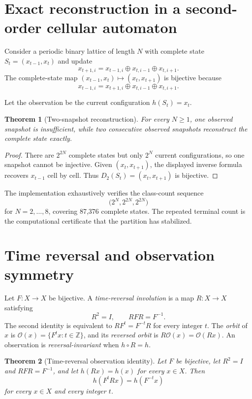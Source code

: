 \documentclass[11pt]{article}
\newtheorem{theorem}{Theorem}
\newcommand{\Z}{\mathbb{Z}}
\begin{document}
\section{Exact reconstruction in a second-order cellular automaton}

Consider a periodic binary lattice of length $N$ with complete state
$S_t=(x_{t-1},x_t)$ and update
\[
x_{t+1,i}=x_{t-1,i}\oplus x_{t,i-1}\oplus x_{t,i+1}.
\]
The complete-state map $(x_{t-1},x_t)\mapsto(x_t,x_{t+1})$ is bijective because
\[
x_{t-1,i}=x_{t+1,i}\oplus x_{t,i-1}\oplus x_{t,i+1}.
\]

Let the observation be the current configuration $h(S_t)=x_t$.

\begin{theorem}[Two-snapshot reconstruction]
For every $N\geq1$, one observed snapshot is insufficient, while two consecutive
observed snapshots reconstruct the complete state exactly.
\end{theorem}

\begin{proof}
There are $2^{2N}$ complete states but only $2^N$ current configurations, so one
snapshot cannot be injective. Given $(x_t,x_{t+1})$, the displayed inverse formula
recovers $x_{t-1}$ cell by cell. Thus $D_2(S_t)=(x_t,x_{t+1})$ is bijective.
\end{proof}

The implementation exhaustively verifies the class-count sequence
\[
\bigl(2^N,2^{2N},2^{2N}\bigr)
\]
for $N=2,\ldots,8$, covering 87,376 complete states. The repeated terminal count
is the computational certificate that the partition has stabilized.

\section{Time reversal and observation symmetry}

Let $F:X\to X$ be bijective. A \emph{time-reversal involution} is a map
$R:X\to X$ satisfying
\[
R^2=I,
\qquad
RFR=F^{-1}.
\]
The second identity is equivalent to $RF^t=F^{-t}R$ for every integer $t$. The
\emph{orbit} of $x$ is $\mathcal O(x)=\{F^t x:t\in\Z\}$, and its
\emph{reversed orbit} is $R\mathcal O(x)=\mathcal O(Rx)$. An observation is
\emph{reversal-invariant} when $h\circ R=h$.

\begin{theorem}[Time-reversal observation identity]\label{thm:time-reversal}
Let $F$ be bijective, let $R^2=I$ and $RFR=F^{-1}$, and let
$h(Rx)=h(x)$ for every $x\in X$. Then
\[
h(F^tRx)=h(F^{-t}x)
\]
for every $x\in X$ and every integer $t$.
\end{theorem}
\end{document}
